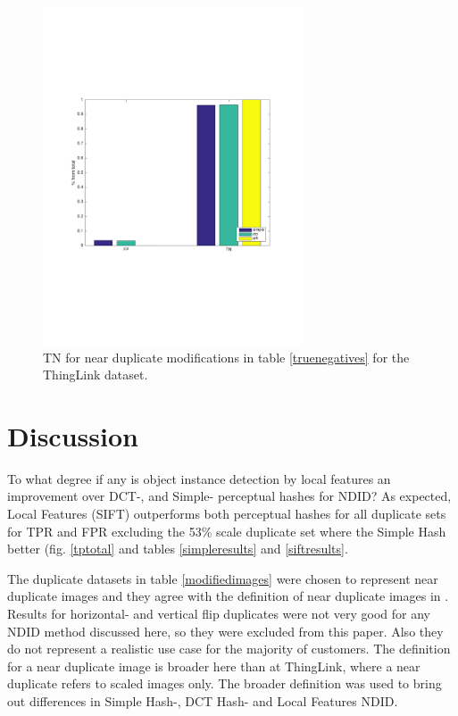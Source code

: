 \documentclass[english,12pt,a4paper,pdftex,elec,utf8]{aaltothesis}
\begin{document}
\begin{figure}[htb]
\begin{center}
\includegraphics[height=10cm]{figures/thinglink_tnBar}
\end{center}
\caption{ TN for near duplicate modifications in table \ref{truenegatives} for the ThingLink dataset.}
\label{thinglinktntotal}
\end{figure}


\clearpage

\section{Discussion}
To what degree if any is object instance detection by local features an improvement over DCT-, and Simple- perceptual hashes for NDID? As expected, Local Features (SIFT) outperforms both perceptual hashes for all duplicate sets for TPR and FPR excluding the 53\% scale duplicate set where the Simple Hash better (fig. \ref{tptotal} and tables \ref{simpleresults} and \ref{siftresults}.

The duplicate datasets in table \ref{modifiedimages} were chosen to represent near duplicate images and they agree with the definition of near duplicate images in \cite{Wang2013}. Results for horizontal- and vertical flip duplicates were not very good for any NDID method discussed here, so they were excluded from this paper. Also they do not represent a realistic use case for the majority of customers. The definition for a near duplicate image is broader here than at ThingLink, where a near duplicate refers to scaled images only. The broader definition was used to bring out differences in Simple Hash-, DCT Hash- and Local Features NDID.
\end{document}
